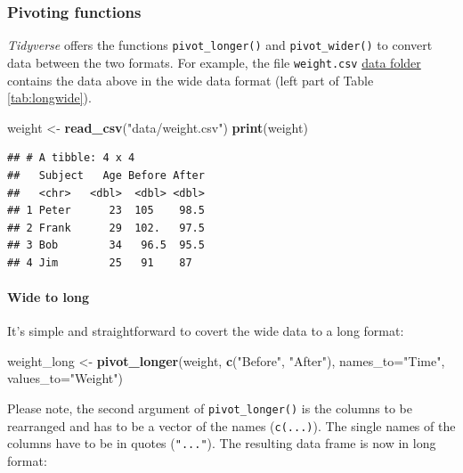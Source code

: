 \documentclass[
]{scrartcl}
\newenvironment{Shaded}{\begin{snugshade}}{\end{snugshade}}
\newcommand{\DataTypeTok}[1]{\textcolor[rgb]{0.13,0.29,0.53}{#1}}
\newcommand{\KeywordTok}[1]{\textcolor[rgb]{0.13,0.29,0.53}{\textbf{#1}}}
\newcommand{\NormalTok}[1]{#1}
\newcommand{\StringTok}[1]{\textcolor[rgb]{0.31,0.60,0.02}{#1}}
\begin{document}
\hypertarget{pivoting-functions}{%
\subsubsection{Pivoting functions}\label{pivoting-functions}}

\emph{Tidyverse} offers the functions \texttt{pivot\_longer()} and \texttt{pivot\_wider()} to convert data between the two formats. For example, the file \texttt{weight.csv} \href{./data}{data folder} contains the data above in the wide data format (left part of Table \ref{tab:longwide}).

\begin{Shaded}
\begin{Highlighting}[]
\NormalTok{weight \textless{}{-}}\StringTok{ }\KeywordTok{read\_csv}\NormalTok{(}\StringTok{"data/weight.csv"}\NormalTok{)}
\KeywordTok{print}\NormalTok{(weight)}
\end{Highlighting}
\end{Shaded}

\begin{verbatim}
## # A tibble: 4 x 4
##   Subject   Age Before After
##   <chr>   <dbl>  <dbl> <dbl>
## 1 Peter      23  105    98.5
## 2 Frank      29  102.   97.5
## 3 Bob        34   96.5  95.5
## 4 Jim        25   91    87
\end{verbatim}

\hypertarget{wide-to-long}{%
\paragraph*{Wide to long}\label{wide-to-long}}

It's simple and straightforward to covert the wide data to a long format:

\begin{Shaded}
\begin{Highlighting}[]
\NormalTok{weight\_long \textless{}{-}}\StringTok{ }\KeywordTok{pivot\_longer}\NormalTok{(weight, }\KeywordTok{c}\NormalTok{(}\StringTok{"Before"}\NormalTok{, }\StringTok{"After"}\NormalTok{), }\DataTypeTok{names\_to=}\StringTok{"Time"}\NormalTok{, }\DataTypeTok{values\_to=}\StringTok{"Weight"}\NormalTok{)}
\end{Highlighting}
\end{Shaded}

Please note, the second argument of \texttt{pivot\_longer()} is the columns to be rearranged and has to be a vector of the names (\texttt{c(...)}). The single names of the columns have to be in quotes (\texttt{"..."}). The resulting data frame is now in long format:
\end{document}
